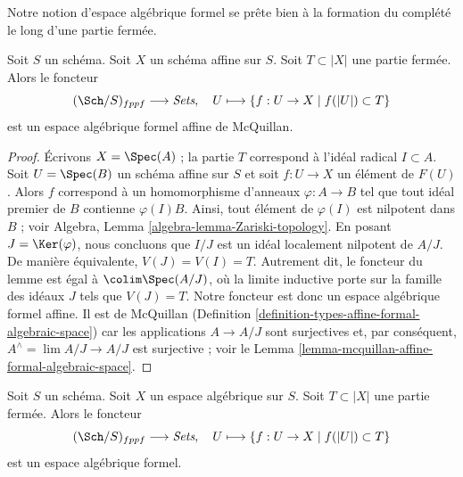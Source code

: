 \noindent
Notre notion d'espace algébrique formel se prête bien à la formation du
complété le long d'une partie fermée.

\begin{lemma}
\label{lemma-completion-affine-is-affine-formal-algebraic-space}
Soit $S$ un schéma. Soit $X$ un schéma affine sur $S$.
Soit $T \subset |X|$ une partie fermée. Alors le foncteur
$$
(\Sch/S)_{fppf} \longrightarrow \textit{Sets},\quad
U \longmapsto \{f : U \to X \mid f(|U|) \subset T\}
$$
est un espace algébrique formel affine de McQuillan.
\end{lemma}

\begin{proof}
Écrivons $X = \Spec(A)$ ; la partie $T$ correspond à l'idéal radical $I \subset A$.
Soit $U = \Spec(B)$ un schéma affine sur $S$ et soit
$f : U \to X$ un élément de $F(U)$. Alors $f$ correspond à un
homomorphisme d'anneaux $\varphi : A \to B$ tel que tout idéal premier de $B$ contienne
$\varphi(I) B$. Ainsi, tout élément de $\varphi(I)$ est nilpotent dans $B$ ; voir
Algebra, Lemma \ref{algebra-lemma-Zariski-topology}.
En posant $J = \Ker(\varphi)$, nous concluons que $I/J$ est un idéal localement
nilpotent de $A/J$. De manière équivalente, $V(J) = V(I) = T$.
Autrement dit, le foncteur du lemme est égal à
$\colim \Spec(A/J)$, où la limite inductive porte sur la
famille des idéaux $J$ tels que $V(J) = T$.
Notre foncteur est donc un espace algébrique formel affine. Il est de McQuillan
(Definition \ref{definition-types-affine-formal-algebraic-space})
car les applications $A \to A/J$ sont surjectives
et, par conséquent, $A^\wedge = \lim A/J \to A/J$ est surjective ; voir le
Lemma \ref{lemma-mcquillan-affine-formal-algebraic-space}.
\end{proof}

\begin{lemma}
\label{lemma-completion-is-formal-algebraic-space}
Soit $S$ un schéma. Soit $X$ un espace algébrique sur $S$.
Soit $T \subset |X|$ une partie fermée. Alors le foncteur
$$
(\Sch/S)_{fppf} \longrightarrow \textit{Sets},\quad
U \longmapsto \{f : U \to X \mid f(|U|) \subset T\}
$$
est un espace algébrique formel.
\end{lemma}

